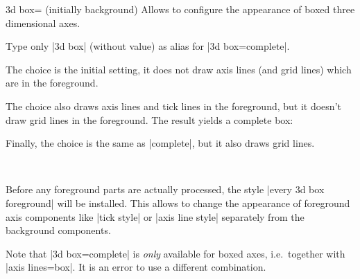 \begin{pgfplotskey}{3d box= (initially background)}
	\label{pgfplots:key:3dbox}
	Allows to configure the appearance of boxed three dimensional axes.

	Type only |3d box| (without value) as alias for |3d box=complete|.

	The choice  is the initial setting, it does not draw axis lines (and grid lines) which are in the foreground.
\begin{codeexample}[]
\end{codeexample}

	The choice  also draws axis lines and tick lines in the foreground, but it doesn't draw grid lines in the foreground. The result yields a complete box:
\begin{codeexample}[]
\end{codeexample}

	Finally, the choice  is the same as |complete|, but it also draws grid lines.
\begin{codeexample}[]
%
~
\end{codeexample}
	
	Before any foreground parts are actually processed, the style |every 3d box foreground| will be installed. This allows to change the appearance of foreground axis components like |tick style| or |axis line style| separately from the background components.

	Note that |3d box=complete| is \emph{only} available for boxed axes, i.e.\ together with |axis lines=box|. It is an error to use a different combination.
\end{pgfplotskey}
